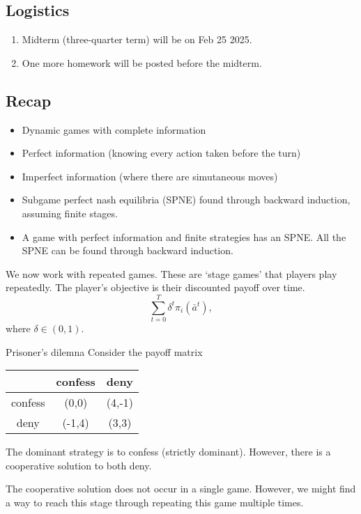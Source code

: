 \newsection
\subsection*{Logistics}
\begin{enumerate}
    \item Midterm (three-quarter term) will be on Feb 25 2025.
    \item One more homework will be posted before the midterm.
\end{enumerate}
\subsection*{Recap}
\begin{itemize}
    \item Dynamic games with complete information
    \item Perfect information (knowing every action taken before the turn)
    \item Imperfect information (where there are simutaneous moves)
    \item Subgame perfect nash equilibria (SPNE) found through backward induction, assuming finite stages.
    \item A game with perfect information and finite strategies has an SPNE. All the SPNE can be found through backward induction.
\end{itemize}


We now work with repeated games. These are `stage games' that players play repeatedly. The player's objective is their discounted payoff over time.
\[
\sum_{t=0}^T \delta^t \pi_i(\bar{a}^t),\]
where $\delta \in (0,1)$.
\begin{aexample}{Prisoner's dilemna}{}
    Consider the payoff matrix \begin{center}
        \begin{tabular}{|c|c c|}
            \hline & confess & deny \\
            \hline 
            confess & (0,0) & (4,-1)\\
            \hline
            deny & (-1,4) & (3,3)\\\hline
        \end{tabular}
    \end{center}
    The dominant strategy is to confess (strictly dominant). However, there is a cooperative solution to both deny.
\end{aexample}
The cooperative solution does not occur in a single game. However, we might find a way to reach this stage through repeating this game multiple times. 

